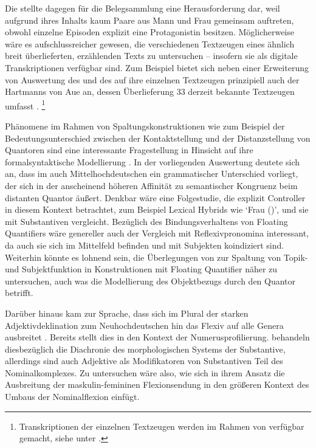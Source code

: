 Die \KC{} stellte dagegen für die Belegsammlung eine Herausforderung
dar, weil aufgrund ihres Inhalts kaum Paare aus Mann und Frau gemeinsam
auftreten, obwohl einzelne Episoden explizit eine Protagonistin besitzen.
Möglicherweise wäre es aufschlussreicher gewesen, die verschiedenen Textzeugen
eines ähnlich breit überlieferten, erzählenden Texts zu untersuchen -- insofern
sie als digitale Transkriptionen verfügbar sind. Zum Beispiel bietet sich neben
einer Erweiterung von  Auswertung des
 und des  auf ihre einzelnen Textzeugen prinzipiell
auch der  Hartmanns von Aue an, dessen Überlieferung 33 derzeit
bekannte Textzeugen umfasst \autocites[vgl.][s.\,v.~\textit{Hartmann von Aue:
}]{hsc}.%
%
	\footnote{Transkriptionen der einzelnen Textzeugen werden im Rahmen von
		 verfügbar gemacht, siehe unter
		.%
	}

Phänomene im Rahmen von Spaltungskonstruktionen wie zum Beispiel der
Bedeutungs\-unterschied zwischen der Kontaktstellung und der Distanzstellung
von Quantoren sind eine interessante Fragestellung in Hinsicht auf ihre
formal\-syntaktische Modellierung \autocite[siehe
z.\,B.][]{pittner1995,merchant1996,fanselowcavar2002,nolda2007,shen2019}. In
der vorliegenden Auswertung deutete sich an, dass im auch
Mittelhochdeutschen ein grammatischer Unterschied
vorliegt, der sich in der anscheinend höheren Affinität zu semantischer
Kongruenz beim distanten Quantor äußert. Denkbar wäre eine Folgestudie, die
explizit  Controller in diesem Kontext betrachtet, zum
Beispiel Lexical Hybrids wie  `Frau (\NeutF)', und sie mit
 Substantiven vergleicht. Bezüglich des Bindungsverhaltens
von Floating Quantifiers wäre genereller auch der Vergleich mit
Reflexivpronomina interessant, da auch sie sich im Mittelfeld befinden und mit
Subjekten koindiziert sind. Weiterhin könnte es lohnend sein, die Überlegungen
von \citet{spector2009} zur Spaltung von Topik- und Subjektfunktion in
Konstruktionen mit Floating Quantifier näher zu untersuchen, auch was die
Modellierung des Objektbezugs durch den Quantor betrifft.

Darüber hinaus kam zur Sprache, dass sich im Plural der starken
Adjektivdeklination zum Neuhochdeutschen hin das Flexiv
 auf alle Genera ausbreitet
\autocite[vgl.][191--192]{reichmannwegera1993}. Bereits \citet{askedal1973}
stellt dies in den Kontext der Numerusprofilierung. \citet{dammelgillmann2014}
behandeln diesbezüglich die Diachronie des morphologischen Systems der
Substantive, allerdings sind auch Adjektive als Modifikatoren von Substantiven
Teil des Nominalkomplexes. Zu untersuchen wäre also, wie sich in ihrem Ansatz
die Ausbreitung der maskulin-femininen Flexionsendung in den größeren Kontext
des Umbaus der Nominal\-flexion einfügt.

